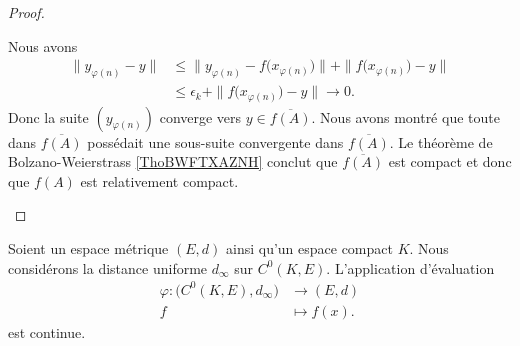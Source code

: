 \begin{proof}
\begin{subproof}
		Nous avons
		\begin{subequations}
			\begin{align}
				\| y_{\varphi(n)}-y \| & \leq \| y_{\varphi(n)}-f\big( x_{\varphi(n)} \big) \|+\| f\big( x_{\varphi(n)} \big)-y \| \\
				                       & \leq \epsilon_k+\| f\big( x_{\varphi(n)} \big)-y \|\to 0.
			\end{align}
		\end{subequations}
		Donc la suite \( (y_{\varphi(n)})\) converge vers \( y\in \overline{ f(A) }\). Nous avons montré que toute dans \( \overline{ f(A) }\) possédait une sous-suite convergente dans \( \overline{ f(A) }\). Le théorème de Bolzano-Weierstrass \ref{ThoBWFTXAZNH} conclut que \( \overline{ f(A) }\) est compact et donc que \( f(A)\) est relativement compact.
	\end{subproof}
\end{proof}


\begin{lemma}	\label{LEMooQCJTooNmMXEC}
	Soient un espace métrique \( (E,d)\) ainsi qu'un espace compact \( K\). Nous considérons la distance uniforme \( d_{\infty}\) sur \( C^0(K,E)\). L'application d'évaluation
	\begin{equation}
		\begin{aligned}
			\varphi\colon \big(C^0(K,E),d_{\infty}\big) & \to (E,d)     \\
			f                                           & \mapsto f(x).
		\end{aligned}
	\end{equation}
	est continue.
\end{lemma}

